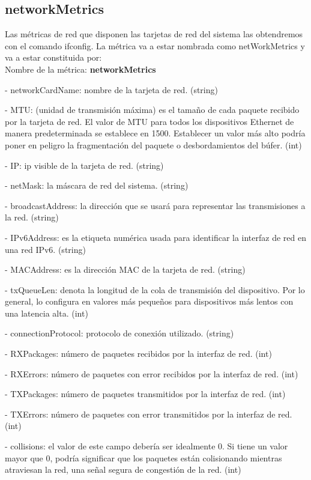 \documentclass[ spanish, a4paper, 12pt, oneside]{report}
\begin{document}
\subsection{networkMetrics}
Las métricas de red que disponen las tarjetas de red del sistema las obtendremos con el comando ifconfig.
La métrica va a estar nombrada como netWorkMetrics y va a estar constituida por:\\
  
Nombre de la métrica: \textbf{networkMetrics}

\hyp{} networkCardName: nombre de la tarjeta de red. (string)

\hyp{} MTU: (unidad de transmisión máxima) es el tamaño de cada paquete recibido por la tarjeta de red. El valor de MTU para todos 
los dispositivos Ethernet de manera predeterminada se establece en 1500. Establecer un valor más alto podría poner en peligro 
la fragmentación del paquete o desbordamientos del búfer. (int)

\hyp{} IP: ip visible de la tarjeta de red. (string)

\hyp{} netMask: la máscara de red del sistema. (string)

\hyp{} broadcastAddress: la dirección que se usará para representar las transmisiones a la red. (string)

\hyp{} IPv6Address: es la etiqueta numérica usada para identificar la interfaz de red en una red IPv6. (string)

\hyp{} MACAddress: es la dirección MAC de la tarjeta de red. (string)

\hyp{} txQueueLen: denota la longitud de la cola de transmisión del dispositivo. Por lo general, lo configura en valores más pequeños 
para dispositivos más lentos con una latencia alta. (int)

\hyp{} connectionProtocol: protocolo de conexión utilizado. (string)

\hyp{} RXPackages: número de paquetes recibidos por la interfaz de red. (int)

\hyp{} RXErrors: número de paquetes con error recibidos por la interfaz de red. (int)

\hyp{} TXPackages: número de paquetes transmitidos por la interfaz de red. (int)

\hyp{} TXErrors: número de paquetes con error transmitidos por la interfaz de red. (int)

\hyp{} collisions: el valor de este campo debería ser idealmente 0. Si tiene un valor mayor que 0, podría significar que los paquetes
están colisionando mientras atraviesan la red, una señal segura de congestión de la red. (int)
\end{document}

